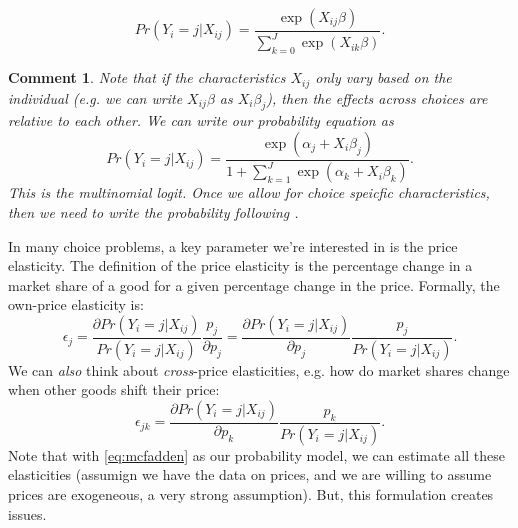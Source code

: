 \documentclass{tufte-handout}
\theoremstyle{break}
\newtheorem{cmt}{Comment}
\begin{document}
\begin{equation}
  \label{eq:mcfadden}
  Pr(Y_{i} = j | X_{ij}) = \frac{\exp(X_{ij}\beta)}{\sum_{k=0}^{J}\exp(X_{ik}\beta)}.
\end{equation}
\begin{boxF}
  \begin{cmt}
  Note that if the characteristics $X_{ij}$ only vary based on the individual (e.g. we can write $X_{ij}\beta$ as $X_{i}\beta_{j}$), then the effects across choices are \emph{relative} to each other. We can write our probability equation as
\begin{equation}
  Pr(Y_{i} = j | X_{ij}) = \frac{\exp(\alpha_{j} + X_{i}\beta_{j})}{1 + \sum_{k=1}^{J}\exp(\alpha_{k} + X_{i}\beta_{k})}.
\end{equation}
This is the \emph{multinomial logit}. Once we allow for choice speicfic characteristics, then we need to write the probability following .
  \end{cmt}
\end{boxF}

In many choice problems, a key parameter we're interested in is the price elasticity. The definition of the price elasticity is the percentage change in a market share of a good for a given percentage change in the price. Formally, the own-price elasticity is:
\begin{equation}
  \epsilon_{j} = \frac{\partial Pr(Y_{i} = j | X_{ij})}{Pr(Y_{i} = j | X_{ij})}\frac{p_{j}}{\partial p_{j}} = \frac{\partial Pr(Y_{i} = j | X_{ij})}{\partial p_{j}}\frac{p_{j}}{Pr(Y_{i} = j | X_{ij})}.
\end{equation}
We can \emph{also} think about \emph{cross}-price elasticities, e.g. how do market shares change when other goods shift their price: 
\begin{equation}
  \epsilon_{jk} = \frac{\partial Pr(Y_{i} = j | X_{ij})}{\partial p_{k}}\frac{p_{k}}{Pr(Y_{i} = j | X_{ij})}.
\end{equation}
Note that with \cref{eq:mcfadden} as our probability model, we can estimate all these elasticities (assumign we have the data on prices, and we are willing to assume prices are exogeneous, a very strong assumption). But, this formulation creates issues.
      
\end{document}

